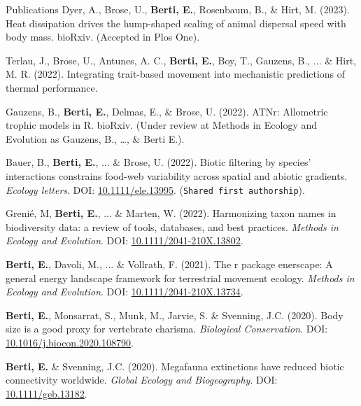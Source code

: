 \documentclass{resume} %
\begin{document}
\begin{rSection}{Publications}
Dyer, A., Brose, U., \textbf{Berti, E.}, Rosenbaum, B., \& Hirt, M. (2023). Heat dissipation drives the hump-shaped scaling of animal dispersal speed with body mass. bioRxiv. (Accepted in Plos One).

Terlau, J., Brose, U., Antunes, A. C., \textbf{Berti, E.}, Boy, T., Gauzens, B., ... \& Hirt, M. R. (2022). Integrating trait-based movement into mechanistic predictions of thermal performance.

Gauzens, B., \textbf{Berti, E.}, Delmas, E., \& Brose, U. (2022). ATNr: Allometric trophic models in R. bioRxiv. (Under review at Methods in Ecology and Evolution as Gauzens, B., \dots, \& Berti E.).

Bauer, B., \textbf{Berti, E.}, ... \& Brose, U. (2022). Biotic filtering by species’ interactions constrains food-web variability across spatial and abiotic gradients. \textit{Ecology letters}. DOI: \href{https://doi.org/10.1111/ele.13995}{10.1111/ele.13995}. (\texttt{Shared first authorship}).

Grenié, M, \textbf{Berti, E.}, ... \& Marten, W. (2022). Harmonizing taxon names in biodiversity data: a review of tools, databases, and best practices. \textit{Methods in Ecology and Evolution}. DOI: \href{https://doi.org/10.1111/2041-210X.13802}{10.1111/2041-210X.13802}.

\textbf{Berti, E.}, Davoli, M., ... \& Vollrath, F. (2021). The r package enerscape: A general energy landscape framework for terrestrial movement ecology. \textit{Methods in Ecology and Evolution}. DOI: \href{https://doi.org/10.1111/2041-210X.13734}{10.1111/2041-210X.13734}.

\textbf{Berti, E.}, Monsarrat, S., Munk, M., Jarvie, S. \& Svenning, J.C. (2020). Body size is a good proxy for vertebrate charisma. \textit{Biological Conservation}. DOI: \href{https://doi.org/10.1016/j.biocon.2020.108790}{10.1016/j.biocon.2020.108790}.

\textbf{Berti, E.} \& Svenning, J.C. (2020). Megafauna extinctions have reduced biotic connectivity worldwide. \textit{Global Ecology and Biogeography}. DOI: \href{https://doi.org/10.1111/geb.13182}{10.1111/geb.13182}.
\end{rSection}
\end{document}
